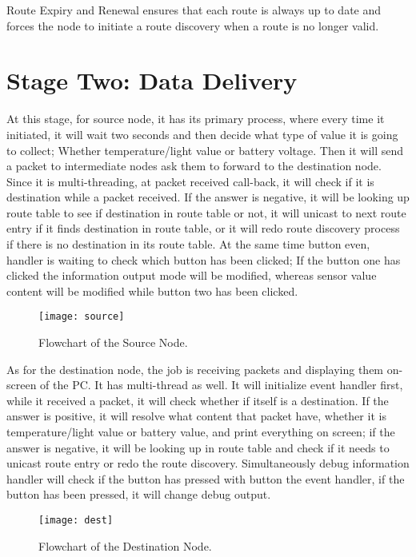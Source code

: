 Route Expiry and Renewal ensures that each route is always up to date and forces the node to initiate a route discovery when a route is no longer valid.

\section{Stage Two: Data Delivery}

At this stage, for source node, it has its primary process, where every time it initiated, it will wait two seconds and then decide what type of value it is going to collect; Whether temperature/light value or battery voltage. Then it will send a packet to intermediate nodes ask them to forward to the destination node. Since it is multi-threading, at packet received call-back, it will check if it is destination while a packet received. If the answer is negative, it will be looking up route table to see if destination in route table or not, it will unicast to next route entry if it finds destination in route table, or it will redo route discovery process if there is no destination in its route table. At the same time button even, handler is waiting to check which button has been clicked; If the button one has clicked the information output mode will be modified, whereas sensor value content will be modified while button two has been clicked.

\begin{figure}
\centering
\texttt{[image: source]}
\caption{Flowchart of the Source Node.}
\label{fig:source}
\end{figure}

As for the destination node, the job is receiving packets and displaying them on-screen of the PC. It has multi-thread as well. It will initialize event handler first, while it received a packet, it will check whether if itself is a destination. If the answer is positive, it will resolve what content that packet have, whether it is temperature/light value or battery value, and print everything on screen; if the answer is negative, it will be looking up in route table and check if it needs to unicast route entry or redo the route discovery. Simultaneously debug information handler will check if the button has pressed with button the event handler, if the button has been pressed, it will change debug output. 


\begin{figure}
\centering
\texttt{[image: dest]}
\caption{Flowchart of the Destination Node.}
\label{fig:dest}
\end{figure}



